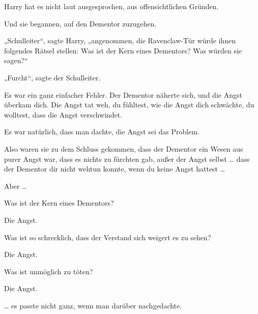 Harry hat es nicht laut ausgesprochen, aus offensichtlichen Gründen.

Und sie begannen, auf den Dementor zuzugehen.

„Schulleiter“, sagte Harry, „angenommen, die Ravenclaw-Tür würde ihnen folgendes Rätsel stellen: Was ist der Kern eines Dementors? Was würden sie sagen?“

„Furcht“, sagte der Schulleiter.

Es war ein ganz einfacher Fehler. Der Dementor näherte sich, und die Angst überkam dich. Die Angst tat weh, du fühltest, wie die Angst dich schwächte, du wolltest, dass die Angst verschwindet.

Es war natürlich, dass man dachte, die Angst sei das Problem.

Also waren sie zu dem Schluss gekommen, dass der Dementor ein Wesen aus purer Angst war, dass es nichts zu fürchten gab, außer der Angst selbst … dass der Dementor dir nicht wehtun konnte, wenn du keine Angst hattest …

Aber …

\begin{em}
Was ist der Kern eines Dementors?

Die Angst.

Was ist so schrecklich, dass der Verstand sich weigert es zu sehen?

Die Angst.

Was ist unmöglich zu töten?

Die Angst.
\end{em}

… es passte nicht ganz, wenn man darüber nachgedachte.


